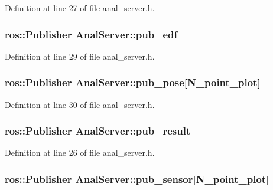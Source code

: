 Definition at line 27 of file anal\+\_\+server.\+h.

\subsubsection[{\texorpdfstring{pub\+\_\+edf}{pub_edf}}]{\setlength{\rightskip}{0pt plus 5cm}ros\+::\+Publisher Anal\+Server\+::pub\+\_\+edf}\hypertarget{class_anal_server_a41a4fa268c86b0c441ccce6b8cb9c9f1}{}\label{class_anal_server_a41a4fa268c86b0c441ccce6b8cb9c9f1}


Definition at line 29 of file anal\+\_\+server.\+h.

\subsubsection[{\texorpdfstring{pub\+\_\+pose}{pub_pose}}]{\setlength{\rightskip}{0pt plus 5cm}ros\+::\+Publisher Anal\+Server\+::pub\+\_\+pose\mbox{[}{\bf N\+\_\+point\+\_\+plot}\mbox{]}}\hypertarget{class_anal_server_ac0cc039c74453254b262b6a4c366ace8}{}\label{class_anal_server_ac0cc039c74453254b262b6a4c366ace8}


Definition at line 30 of file anal\+\_\+server.\+h.

\subsubsection[{\texorpdfstring{pub\+\_\+result}{pub_result}}]{\setlength{\rightskip}{0pt plus 5cm}ros\+::\+Publisher Anal\+Server\+::pub\+\_\+result}\hypertarget{class_anal_server_aca3157ed885fa6b5cebfd1c19e54f99b}{}\label{class_anal_server_aca3157ed885fa6b5cebfd1c19e54f99b}


Definition at line 26 of file anal\+\_\+server.\+h.

\subsubsection[{\texorpdfstring{pub\+\_\+sensor}{pub_sensor}}]{\setlength{\rightskip}{0pt plus 5cm}ros\+::\+Publisher Anal\+Server\+::pub\+\_\+sensor\mbox{[}{\bf N\+\_\+point\+\_\+plot}\mbox{]}}\hypertarget{class_anal_server_a3bcdba55d77454f4837a8c2254c9deec}{}\label{class_anal_server_a3bcdba55d77454f4837a8c2254c9deec}


